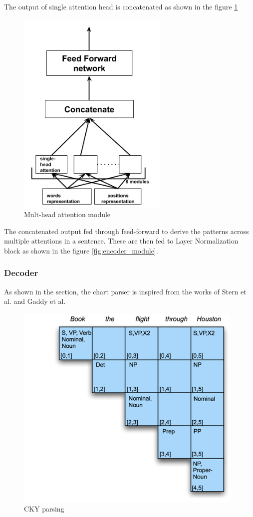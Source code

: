 \documentclass[a4paper, 11pt]{article}
\begin{document}
The output of single attention head is concatenated as shown in the figure \ref{fig:multi_head_attention_module}
\begin{figure}[htpb]
    \centering
    \includegraphics[width=\textwidth,height=10cm,keepaspectratio=true]
    {multi-head-attention.png}
    \caption{
        Mult-head attention module
    }
    \label{fig:multi_head_attention_module}
\end{figure}

The concatenated output fed through feed-forward to derive the patterns across multiple attentions in a sentence. These are then fed to Layer Normalization block as shown in the figure \ref{fig:encoder_module}.

\subsubsection{Decoder}
As shown in the section, the chart parser is inspired from the works of Stern et al. and Gaddy et al.

\begin{figure}[htpb]
    \centering
    \includegraphics[width=\textwidth,height=10cm,keepaspectratio=true]
    {cky-3.png}
    \caption{
        CKY parsing
    }
    \label{fig:CKY}
\end{figure}
\end{document}
